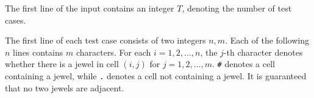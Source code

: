 The first line of the input contains an integer $T$, denoting the number of test cases.

The first line of each test case consists of two integers $n,m$.
Each of the following $n$ lines contains $m$ characters.
For each $i = 1,2,\ldots,n$, the $j$-th character denotes whether there is a jewel in cell $(i,j)$ for $j = 1,2,\ldots,m$. \texttt{\#} denotes a cell containing a jewel, while \texttt{.} denotes a cell not containing a jewel.
It is guaranteed that no two jewels are adjacent.